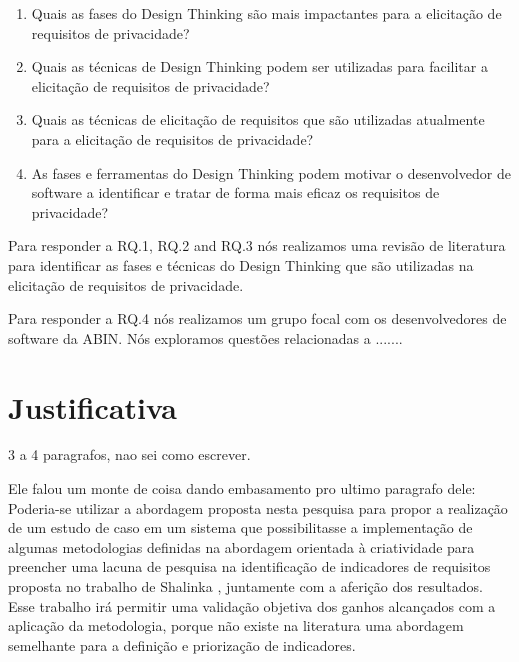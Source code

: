 \begin{enumerate}[RQ.1:]

\item Quais as fases do Design Thinking são mais impactantes para a elicitação de requisitos de privacidade?

\item Quais as técnicas de Design Thinking podem ser utilizadas para facilitar a elicitação de requisitos de privacidade?

\item Quais as técnicas de elicitação de requisitos que são utilizadas atualmente para a elicitação de requisitos de privacidade?

\item As fases e ferramentas do Design Thinking podem motivar o desenvolvedor de software a identificar e tratar de forma mais eficaz os requisitos de privacidade?

\end{enumerate}

Para responder a RQ.1, RQ.2 and RQ.3 nós realizamos uma revisão de literatura para identificar as fases e técnicas do Design Thinking que são utilizadas na elicitação de requisitos de privacidade.

Para responder a RQ.4 nós realizamos um grupo focal com os desenvolvedores de software da ABIN. Nós exploramos questões relacionadas a .......


\section{Justificativa}%

3 a 4 paragrafos, nao sei como escrever. 


Ele falou um monte de coisa dando embasamento pro ultimo paragrafo dele:
Poderia-se utilizar a abordagem proposta nesta pesquisa para propor a realização de um estudo de caso em um sistema que possibilitasse a implementação de algumas metodologias definidas na abordagem orientada à criatividade para preencher uma lacuna de pesquisa na identificação de indicadores de requisitos proposta no trabalho de Shalinka \cite{shalinka}, juntamente com a aferição dos resultados. Esse trabalho irá permitir uma validação objetiva dos ganhos alcançados com a aplicação da metodologia, porque não existe na literatura uma abordagem semelhante para a definição e priorização de indicadores.  

